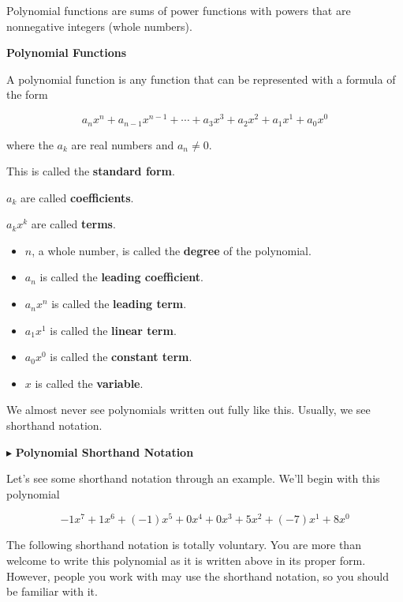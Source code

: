 \documentclass{ximera}
\begin{document}
Polynomial functions are sums of power functions with powers that are nonnegative integers (whole numbers).


\begin{definition} \textbf{\textcolor{green!50!black}{Polynomial Functions}} 

A polynomial function is any function that can be represented with a formula of the form

\[    a_n x^n + a_{n-1} x^{n-1} + \cdots + a_3 x^3 + a_2 x^2 + a_1 x^1 + a_0 x^0      \]

where the $a_k$ are real numbers and $a_n \ne 0$.

This is called the \textbf{standard form}.

$a_k$ are called \textbf{coefficients}.

$a_k x^k$ are called \textbf{terms}.



\begin{itemize}
\item $n$, a whole number, is called the \textbf{degree} of the polynomial.
\item $a_n$ is called the \textbf{leading coefficient}.
\item $a_n x^n$ is called the \textbf{leading term}.
\item $a_1 x^1$ is called the \textbf{linear term}.
\item $a_0 x^0$ is called the \textbf{constant term}.
\item $x$ is called the \textbf{variable}.
\end{itemize}


\end{definition}




We almost never see polynomials written out fully like this.  Usually, we see shorthand notation.   



$\blacktriangleright$ \textbf{\textcolor{blue!55!black}{Polynomial Shorthand Notation}}



Let's see some shorthand notation through an example.  We'll begin with this polynomial


\[  -1 x^7 + 1 x^6 + (-1) x^5 + 0 x^4 + 0 x^3 + 5 x^2 + (-7) x^1 + 8 x^0              \]



The following shorthand notation is totally voluntary.  You are more than welcome to write this polynomial as it is written above in its proper form. However, people you work with may use the shorthand notation, so you should be familiar with it.
\end{document}
